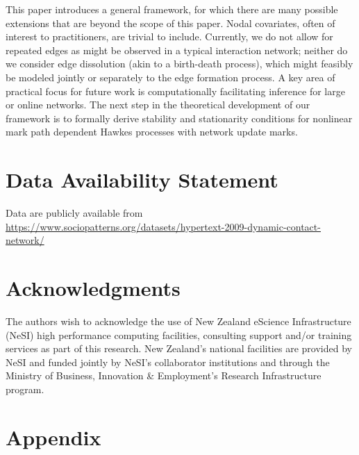 \documentclass[12pt]{article}
\begin{document}
This paper introduces a general framework, for which there are many possible extensions that are beyond the scope of this paper. Nodal covariates, often of interest to practitioners, are trivial to include. Currently, we do not allow for repeated edges as might be observed in a typical interaction network; neither do we consider edge dissolution (akin to a birth-death process), which might feasibly be modeled jointly or separately to the edge formation process. A key area of practical focus for future work is computationally facilitating inference for large or online networks. The next step in the theoretical development of our framework is to formally derive stability and stationarity conditions for nonlinear mark path dependent Hawkes processes with network update marks.

\section{Data Availability Statement}\label{data-availability-statement}

Data are publicly available from \url{https://www.sociopatterns.org/datasets/hypertext-2009-dynamic-contact-network/}

\anon
{
\section{Acknowledgments}\label{sec:acks}
The authors wish to acknowledge the use of New Zealand eScience Infrastructure (NeSI) high performance computing facilities, consulting support and/or training services as part of this research. New Zealand's national facilities are provided by NeSI and funded jointly by NeSI's collaborator institutions and through the Ministry of Business, Innovation \& Employment's Research Infrastructure program. %
} \fi

\clearpage 

\clearpage

\section{Appendix}

\end{document}
